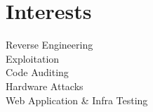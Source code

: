 \documentclass[letterpaper]{deedy-resume} %
\begin{document}
\begin{minipage}[t]{0.33\textwidth}
\sectionspace %
\sectionspace %


%
%
%
%

%
%
%
%
%


\section{Interests}
\sectionspace %
\textbullet{} Reverse Engineering \\
\textbullet{} Exploitation\\
\textbullet{} Code Auditing\\
\textbullet{} Hardware Attacks\\
\textbullet{} Web Application \& Infra Testing\\



\end{minipage}
\end{document}

